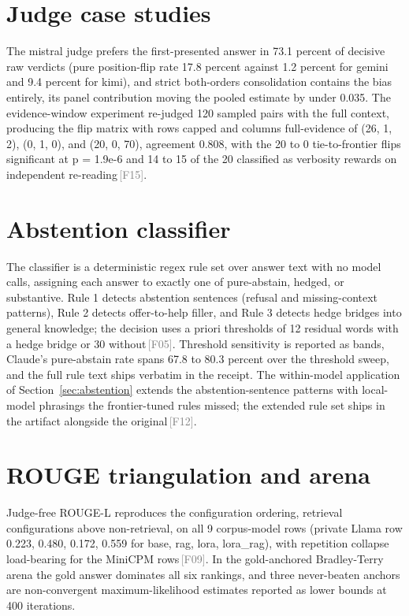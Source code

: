 \documentclass[11pt]{article}
\newcommand{\rcpt}[1]{\textcolor{gray}{\,\textsf{\scriptsize[#1]}}}
\begin{document}
\section{Judge case studies}
\label{app:cases}
The mistral judge prefers the first-presented answer in 73.1 percent of decisive raw verdicts (pure position-flip rate 17.8 percent against 1.2 percent for gemini and 9.4 percent for kimi), and strict both-orders consolidation contains the bias entirely, its panel contribution moving the pooled estimate by under 0.035. The evidence-window experiment re-judged 120 sampled pairs with the full context, producing the flip matrix with rows capped and columns full-evidence of (26, 1, 2), (0, 1, 0), and (20, 0, 70), agreement 0.808, with the 20 to 0 tie-to-frontier flips significant at p = 1.9e-6 and 14 to 15 of the 20 classified as verbosity rewards on independent re-reading\rcpt{F15}.

\section{Abstention classifier}
\label{app:classifier}
The classifier is a deterministic regex rule set over answer text with no model calls, assigning each answer to exactly one of pure-abstain, hedged, or substantive. Rule 1 detects abstention sentences (refusal and missing-context patterns), Rule 2 detects offer-to-help filler, and Rule 3 detects hedge bridges into general knowledge; the decision uses a priori thresholds of 12 residual words with a hedge bridge or 30 without\rcpt{F05}. Threshold sensitivity is reported as bands, Claude's pure-abstain rate spans 67.8 to 80.3 percent over the threshold sweep, and the full rule text ships verbatim in the receipt. The within-model application of Section~\ref{sec:abstention} extends the abstention-sentence patterns with local-model phrasings the frontier-tuned rules missed; the extended rule set ships in the artifact alongside the original\rcpt{F12}.

\section{ROUGE triangulation and arena}
\label{app:rouge}
Judge-free ROUGE-L reproduces the configuration ordering, retrieval configurations above non-retrieval, on all 9 corpus-model rows (private Llama row 0.223, 0.480, 0.172, 0.559 for base, rag, lora, lora\_rag), with repetition collapse load-bearing for the MiniCPM rows\rcpt{F09}. In the gold-anchored Bradley-Terry arena the gold answer dominates all six rankings, and three never-beaten anchors are non-convergent maximum-likelihood estimates reported as lower bounds at 400 iterations.
\end{document}
